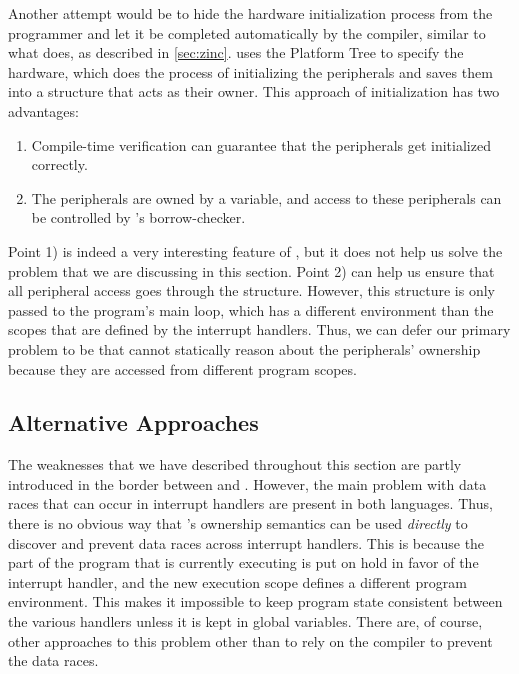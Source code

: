 Another attempt would be to hide the hardware initialization process from the programmer and let it be completed automatically by the compiler, similar to what {\zinc} does, as described in \autoref{sec:zinc}.
{\zinc} uses the Platform Tree to specify the hardware, which does the process of initializing the peripherals and saves them into a  structure that acts as their owner.
This approach of initialization has two advantages:

\begin{enumerate}[\hspace{13pt}1)]
    \item Compile-time verification can guarantee that the peripherals get initialized correctly.
    \item The peripherals are owned by a variable, and access to these peripherals can be controlled by {\rust}'s borrow-checker.
\end{enumerate}

Point 1) is indeed a very interesting feature of {\zinc}, but it does not help us solve the problem that we are discussing in this section.
Point 2) can help us ensure that all peripheral access goes through the  structure.
However, this structure is only passed to the program's main loop, which has a different environment than the scopes that are defined by the interrupt handlers.
Thus, we can defer our primary problem to be that {\rust} cannot statically reason about the peripherals' ownership because they are accessed from different program scopes.

\subsection{Alternative Approaches}

The weaknesses that we have described throughout this section are partly introduced in the border between {\rust} and {\C}.
However, the main problem with data races that can occur in interrupt handlers are present in both languages.
Thus, there is no obvious way that {\rust}'s ownership semantics can be used \emph{directly} to discover and prevent data races across interrupt handlers.
This is because the part of the program that is currently executing is put on hold in favor of the interrupt handler, and the new execution scope defines a different program environment.
This makes it impossible to keep program state consistent between the various handlers unless it is kept in global variables.
There are, of course, other approaches to this problem other than to rely on the compiler to prevent the data races.

